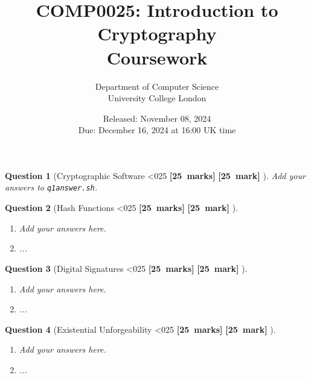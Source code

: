 \documentclass[a4paper]{article}
\theoremstyle{que}
\newtheorem{question}{Question}
\newcommand{\fixoffset}{\mbox{}\vspace*{-\bigskipamount}\vspace*{-\medskipamount}}
\newcommand\points[1]{%
\ifnum1<0#1\relax%
    {\bf \small [#1~marks]}%
  \else%
    {\bf \small [#1~mark]}%
  \fi%
}%
\newcommand{\module}{COMP0025: Introduction to Cryptography}
\newcommand{\university}{Department of Computer Science \\[0.15cm] University College London}
\newcommand{\assessment}{Coursework}
\newcommand{\releaseDate}{November 08, 2024}
\newcommand{\dueDate}{December 16, 2024 at 16:00 UK time}
\begin{document}
\title{\module\\[0.25cm]\assessment}
\author{\university}
\date{Released: \releaseDate\\[0.25cm]Due: \dueDate}
\maketitle

\newpage


\begin{question}[Cryptographic Software \points{25}]
  Add your answers to \texttt{q1answer.sh}.
\end{question}

\newpage


\begin{question}[Hash Functions \points{25}]
  \fixoffset
  \begin{enumerate}[label=(\alph*)]
    \item Add your answers here.
    \item ...
  \end{enumerate}
\end{question}

\newpage


\begin{question}[Digital Signatures \points{25}]
  \fixoffset
  \begin{enumerate}[label=(\alph*)]
    \item Add your answers here.
    \item ...
  \end{enumerate}
\end{question}

\newpage


\begin{question}[Existential Unforgeability \points{25}]
  \fixoffset
  \begin{enumerate}[label=(\alph*)]
    \item Add your answers here.
    \item ...
  \end{enumerate}
\end{question}

\newpage
\end{document}

